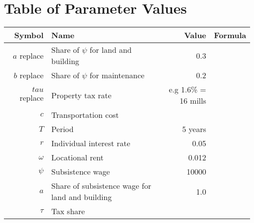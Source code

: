 \section{Table of Parameter Values}

\renewcommand{\arraystretch}{1.5}
\begin{tabular}{rlrr}\
Symbol         & Name                                 & Value      & Formula  \\ \hline
$a$ replace    & Share of $\psi$ for land and building &   0.3         & \\
$b$ replace    & Share of $\psi$ for maintenance       &   0.2         & \\
$tau$ replace  & Property tax rate &  e.g 1.6\% = 16 mills             & \\
$c$       & Transportation cost & \\
$T$       & Period & 5 years      \\
$r$       & Individual interest rate & 0.05 \\
$\omega$  & Locational rent & 0.012  \\
$\psi$    & Subsistence wage & 10000 \\
$a$       & Share of subsistence wage for land and building & 1.0 \\
$\tau$       & Tax share & \\


\end{tabular}
